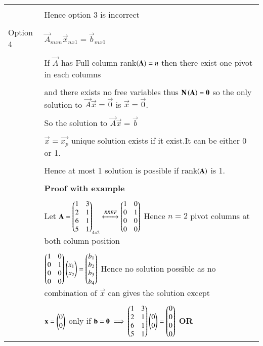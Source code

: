 \documentclass[journal,12pt]{IEEEtran}
\begin{document}
\begin{longtable}{|l|l|}
&\\
&Hence option 3 is incorrect\\
\hline
&\\
Option 4
&$\vec{A}_{mxn}\vec{x}_{nx1}=\vec{b}_{mx1}$\\
&\\
&If $\vec{A}$ has Full column rank$\left(\mathbf{A}\right)=n$ then there exist one pivot in each columns \\
&\\
&and there exists no free variables thus $\mathbf{N\left(A\right)}=\mathbf{0}$ so the only solution to $\vec{A}\vec{x}=\vec{0}$ is $\vec{x}=\vec{0}$.\\ 
&\\
&So the solution to $\vec{A}\vec{x}=\vec{b}$\\
&\\
&$\vec{x}=\vec{x_p}$ unique solution exists if it exist.It can be either 0 or 1.\\
&\\
&Hence at most 1 solution is possible if rank$\left(\mathbf{A}\right)$ is 1.\\
&\\
&\textbf{Proof with example}\\
&\\
&Let $\mathbf{A}=\begin{pmatrix}1&3\\2&1\\6&1\\5&1\end{pmatrix}_{4x2}\xleftrightarrow{RREF}\begin{pmatrix}1&0\\0&1\\0&0\\0&0\end{pmatrix}$ Hence $n=2$ pivot columns at both column position \\ 
&\\
&$\begin{pmatrix}1&0\\0&1\\0&0\\0&0\end{pmatrix}\begin{pmatrix}x_1\\x_2\end{pmatrix}=\begin{pmatrix}b_1\\b_2\\b_3\\b_4\end{pmatrix}$ Hence no solution possible  as no combination of $\vec{x}$ can gives the solution except\\
&\\
&$\mathbf{x}=\begin{pmatrix}0\\0\end{pmatrix}$ only if $\mathbf{b}=\mathbf{0} \implies \begin{pmatrix}1&3\\2&1\\6&1\\5&1\end{pmatrix}\begin{pmatrix}0\\0\end{pmatrix}=\begin{pmatrix}0\\0\\0\\0\end{pmatrix}$ \textbf{OR}\\

\end{longtable}
\end{document}
